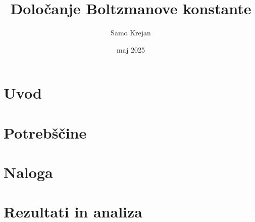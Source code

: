 \documentclass[12pt]{article}
\title{\textbf{Določanje Boltzmanove konstante}}
\author{Samo Krejan}
\date{maj 2025}
\begin{document}
\maketitle

\section{Uvod}


\section{Potrebščine}


\section{Naloga}


\section{Rezultati in analiza}
\end{document}
